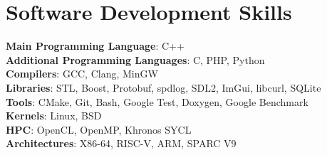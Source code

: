 \documentclass[a4paper,11pt]{article}
\makeatletter
\newcommand{\resumeSubheading}[4]{
    \vspace{-2pt}\item
    \begin{tabular*}{0.97\textwidth}[t]{l@{\extracolsep{\fill}}r}
        \textbf{#1} & #2 \\
        \textit{\small #3} & \textit{\small #4} \\
    \end{tabular*}\vspace{-10pt}
}
\newcommand{\resumeSubHeadingListStart}{\begin{itemize}[leftmargin=0.15in, label={}]}
\newcommand{\resumeSubHeadingListEnd}{\end{itemize}}
\makeatother
\begin{document}

\section{Software Development Skills}
\begin{itemize}[leftmargin=0.15in, label={}]
    \normalsize{\item{
                    \textbf{Main Programming Language}{: C++} \\
                    \textbf{Additional Programming Languages}{: C, PHP, Python} \\
                    \textbf{Compilers}{: GCC, Clang, MinGW} \\
                    \textbf{Libraries}{: STL, Boost, Protobuf, spdlog, SDL2, ImGui, libcurl, SQLite} \\
                    \textbf{Tools}{: CMake, Git, Bash, Google Test, Doxygen, Google Benchmark} \\
                    \textbf{Kernels}{: Linux, BSD} \\
                    \textbf{HPC}{: OpenCL, OpenMP, Khronos SYCL} \\
                    \textbf{Architectures}{: X86-64, RISC-V, ARM, SPARC V9} \\
              }}
\end{itemize}

\end{document}
